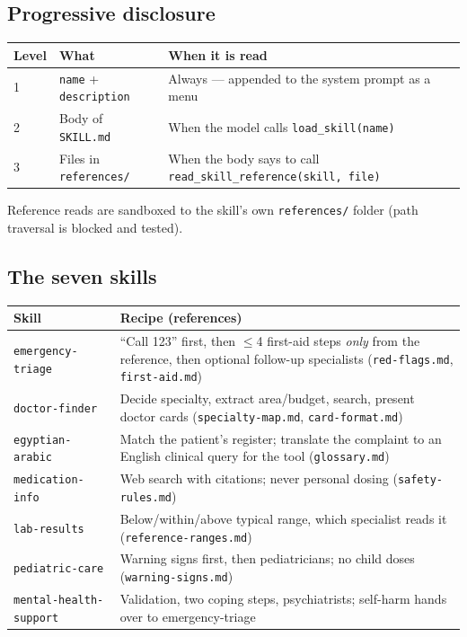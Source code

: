 \documentclass[11pt,a4paper]{article}
\newcommand{\code}[1]{\texttt{#1}}
\begin{document}
\subsection{Progressive disclosure}
\begin{center}\small
\begin{tabular}{@{}lll@{}}
\toprule
\textbf{Level} & \textbf{What} & \textbf{When it is read} \\
\midrule
1 & \code{name} + \code{description} & Always --- appended to the system prompt as a menu \\
2 & Body of \code{SKILL.md} & When the model calls \code{load\_skill(name)} \\
3 & Files in \code{references/} & When the body says to call \code{read\_skill\_reference(skill, file)} \\
\bottomrule
\end{tabular}
\end{center}

Reference reads are sandboxed to the skill's own \code{references/} folder (path traversal is blocked and tested).

\subsection{The seven skills}
\begin{center}\small
\begin{tabularx}{\linewidth}{@{}lY@{}}
\toprule
\textbf{Skill} & \textbf{Recipe (references)} \\
\midrule
\code{emergency-triage} & ``Call 123'' first, then $\le$4 first-aid steps \emph{only} from the reference, then optional follow-up specialists (\code{red-flags.md}, \code{first-aid.md}) \\
\code{doctor-finder} & Decide specialty, extract area/budget, search, present doctor cards (\code{specialty-map.md}, \code{card-format.md}) \\
\code{egyptian-arabic} & Match the patient's register; translate the complaint to an English clinical query for the tool (\code{glossary.md}) \\
\code{medication-info} & Web search with citations; never personal dosing (\code{safety-rules.md}) \\
\code{lab-results} & Below/within/above typical range, which specialist reads it (\code{reference-ranges.md}) \\
\code{pediatric-care} & Warning signs first, then pediatricians; no child doses (\code{warning-signs.md}) \\
\code{mental-health-support} & Validation, two coping steps, psychiatrists; self-harm hands over to emergency-triage \\
\bottomrule
\end{tabularx}
\end{center}
\end{document}
